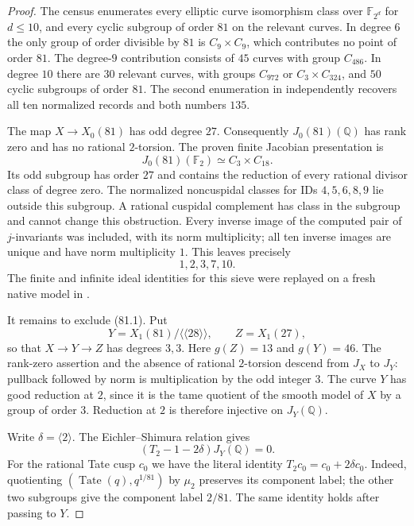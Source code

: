\begin{proof}
The census enumerates every elliptic curve isomorphism class over
$\mathbb F_{2^d}$ for $d\leq10$, and every cyclic subgroup of order
$81$ on the relevant curves. In degree $6$ the only group of order
divisible by $81$ is $C_9\times C_9$, which contributes no point of
order $81$. The degree-$9$ contribution consists of $45$ curves with
group $C_{486}$. In degree $10$ there are $30$ relevant curves, with
groups $C_{972}$ or $C_3\times C_{324}$, and $50$ cyclic subgroups of
order $81$. The second enumeration in
 independently recovers
all ten normalized records and both numbers $135$.

The map $X\longrightarrow X_0(81)$ has odd degree $27$. Consequently
$J_0(81)(\mathbb Q)$ has rank zero and has no rational $2$-torsion.
The proven finite Jacobian presentation is
\[
 J_0(81)(\mathbb F_2)\simeq C_3\times C_{18}.
\]
Its odd subgroup has order $27$ and contains the reduction of every
rational divisor class of degree zero. The normalized noncuspidal
classes for IDs $4,5,6,8,9$ lie outside this subgroup. A rational
cuspidal complement has class in the subgroup and cannot change this
obstruction. Every inverse image of the computed pair of $j$-invariants
was included, with its norm multiplicity; all ten inverse images are
unique and have norm multiplicity $1$. This leaves precisely
\[
                  1,2,3,7,10.                         \tag{81.1}
\]
The finite and infinite ideal identities for this sieve were replayed
on a fresh native model in .

It remains to exclude (81.1). Put
\[
 Y=X_1(81)/\langle\langle28\rangle\rangle,
 \qquad Z=X_1(27),
\]
so that $X\longrightarrow Y\longrightarrow Z$ has degrees $3,3$.
Here $g(Z)=13$ and $g(Y)=46$. The rank-zero assertion and the absence
of rational $2$-torsion descend from $J_X$ to $J_Y$: pullback followed
by norm is multiplication by the odd integer $3$. The curve $Y$ has
good reduction at $2$, since it is the tame quotient of the smooth
model of $X$ by a group of order $3$. Reduction at $2$ is therefore
injective on $J_Y(\mathbb Q)$.

Write $\delta=\langle2\rangle$. The Eichler--Shimura relation gives
\[
             (T_2-1-2\delta)J_Y(\mathbb Q)=0.           \tag{81.2}
\]
For the rational Tate cusp $c_0$ we have the literal identity
$T_2c_0=c_0+2\delta c_0$. Indeed, quotienting
$(\operatorname{Tate}(q),q^{1/81})$ by $\mu_2$ preserves its component
label; the other two subgroups give the component label $2/81$.
The same identity holds after passing to $Y$.


\end{proof}

